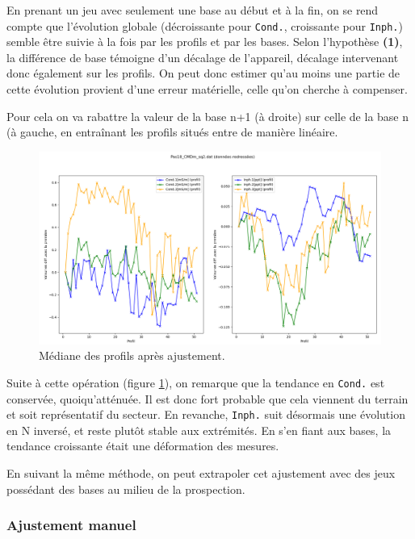 \documentclass[12pt]{article}
\begin{document}
    En prenant un jeu avec seulement une base au début et à la fin, on se rend compte que l'évolution globale (décroissante pour \texttt{Cond.}, croissante pour \texttt{Inph.}) semble être suivie à la fois par les profils et par les bases. Selon l'hypothèse \textbf{(1)}, la différence de base témoigne d'un décalage de l'appareil, décalage intervenant donc également sur les profils. On peut donc estimer qu'au moins une partie de cette évolution provient d'une erreur matérielle, celle qu'on cherche à compenser.

    Pour cela on va rabattre la valeur de la base n+1 (à droite) sur celle de la base n (à gauche, en entraînant les profils situés entre de manière linéaire.

    \newpage
    \begin{figure}[ht!]
        \centering
        \includegraphics[width=\textwidth]{Images/Base_diff_Apres_sq2.png}  
        \caption{Médiane des profils après ajustement.}
        \label{fig:2_evol_base_im}
    \end{figure}

    Suite à cette opération (figure \ref{fig:2_evol_base_im}), on remarque que la tendance en \texttt{Cond.} est conservée, quoiqu'atténuée. Il est donc fort probable que cela viennent du terrain et soit représentatif du secteur. En revanche, \texttt{Inph.} suit désormais une évolution en N inversé, et reste plutôt stable aux extrémités. En s'en fiant aux bases, la tendance croissante était une déformation des mesures.

    En suivant la même méthode, on peut extrapoler cet ajustement avec des jeux possédant des bases au milieu de la prospection.

\subsubsection{Ajustement manuel}
\end{document}
